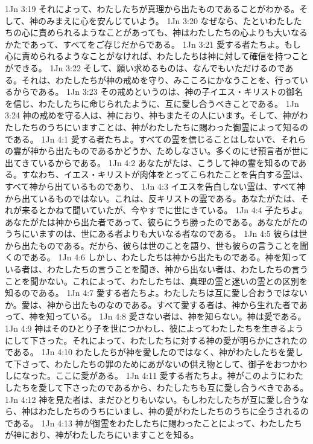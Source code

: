 1Jn 3:19  それによって、わたしたちが真理から出たものであることがわかる。そして、神のみまえに心を安んじていよう。
1Jn 3:20  なぜなら、たといわたしたちの心に責められるようなことがあっても、神はわたしたちの心よりも大いなるかたであって、すべてをご存じだからである。
1Jn 3:21  愛する者たちよ。もし心に責められるようなことがなければ、わたしたちは神に対して確信を持つことができる。
1Jn 3:22  そして、願い求めるものは、なんでもいただけるのである。それは、わたしたちが神の戒めを守り、みこころにかなうことを、行っているからである。
1Jn 3:23  その戒めというのは、神の子イエス・キリストの御名を信じ、わたしたちに命じられたように、互に愛し合うべきことである。
1Jn 3:24  神の戒めを守る人は、神におり、神もまたその人にいます。そして、神がわたしたちのうちにいますことは、神がわたしたちに賜わった御霊によって知るのである。
1Jn 4:1  愛する者たちよ。すべての霊を信じることはしないで、それらの霊が神から出たものであるかどうか、ためしなさい。多くのにせ預言者が世に出てきているからである。
1Jn 4:2  あなたがたは、こうして神の霊を知るのである。すなわち、イエス・キリストが肉体をとってこられたことを告白する霊は、すべて神から出ているものであり、
1Jn 4:3  イエスを告白しない霊は、すべて神から出ているものではない。これは、反キリストの霊である。あなたがたは、それが来るとかねて聞いていたが、今やすでに世にきている。
1Jn 4:4  子たちよ。あなたがたは神から出た者であって、彼らにうち勝ったのである。あなたがたのうちにいますのは、世にある者よりも大いなる者なのである。
1Jn 4:5  彼らは世から出たものである。だから、彼らは世のことを語り、世も彼らの言うことを聞くのである。
1Jn 4:6  しかし、わたしたちは神から出たものである。神を知っている者は、わたしたちの言うことを聞き、神から出ない者は、わたしたちの言うことを聞かない。これによって、わたしたちは、真理の霊と迷いの霊との区別を知るのである。
1Jn 4:7  愛する者たちよ。わたしたちは互に愛し合おうではないか。愛は、神から出たものなのである。すべて愛する者は、神から生れた者であって、神を知っている。
1Jn 4:8  愛さない者は、神を知らない。神は愛である。
1Jn 4:9  神はそのひとり子を世につかわし、彼によってわたしたちを生きるようにして下さった。それによって、わたしたちに対する神の愛が明らかにされたのである。
1Jn 4:10  わたしたちが神を愛したのではなく、神がわたしたちを愛して下さって、わたしたちの罪のためにあがないの供え物として、御子をおつかわしになった。ここに愛がある。
1Jn 4:11  愛する者たちよ。神がこのようにわたしたちを愛して下さったのであるから、わたしたちも互に愛し合うべきである。
1Jn 4:12  神を見た者は、まだひとりもいない。もしわたしたちが互に愛し合うなら、神はわたしたちのうちにいまし、神の愛がわたしたちのうちに全うされるのである。
1Jn 4:13  神が御霊をわたしたちに賜わったことによって、わたしたちが神におり、神がわたしたちにいますことを知る。
